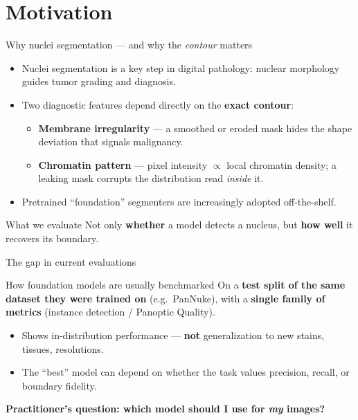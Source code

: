 \section{Motivation}

\begin{frame}{Why nuclei segmentation --- and why the \emph{contour} matters}
    \begin{itemize}
        \item Nuclei segmentation is a key step in digital pathology: nuclear morphology guides tumor grading and diagnosis.
        \item Two diagnostic features depend directly on the \textbf{exact contour}:
        \begin{itemize}
            \item \textbf{Membrane irregularity} --- a smoothed or eroded mask hides the shape deviation that signals malignancy.
            \item \textbf{Chromatin pattern} --- pixel intensity $\propto$ local chromatin density; a leaking mask corrupts the distribution read \emph{inside} it.
        \end{itemize}
        \item Pretrained ``foundation'' segmenters are increasingly adopted off-the-shelf.
    \end{itemize}

    \vspace{0.5em}
    \begin{alertblock}{What we evaluate}
        Not only \textbf{whether} a model detects a nucleus, but \textbf{how well} it recovers its boundary.
    \end{alertblock}
\end{frame}

\begin{frame}{The gap in current evaluations}
    \begin{block}{How foundation models are usually benchmarked}
        On a \textbf{test split of the same dataset they were trained on} (e.g.\ PanNuke), with a \textbf{single family of metrics} (instance detection / Panoptic Quality).
    \end{block}

    \begin{itemize}
        \item Shows in-distribution performance --- \textbf{not} generalization to new stains, tissues, resolutions.
        \item The ``best'' model can depend on whether the task values precision, recall, or boundary fidelity.
    \end{itemize}

    \vspace{0.4em}
    \centering
    {\large\color{myblue}\bfseries Practitioner's question: which model should I use for \emph{my} images?}
\end{frame}

